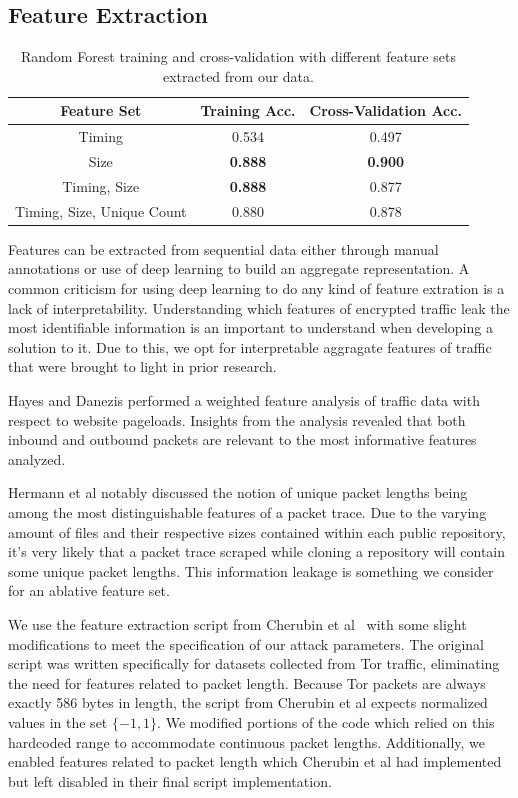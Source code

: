 \documentclass[sigconf,authorversion,nonacm]{acmart}
\begin{document}
\subsection{Feature Extraction}
\begin{center}
  \begin{table}
    \begin{tabular}{ |c || c | c| }
      \hline 
      Feature Set& Training Acc.& Cross-Validation Acc.\\
      \hline
      Timing & 0.534 & 0.497 \\ 
      Size & \textbf{0.888} & \textbf{0.900} \\ 
      Timing, Size & \textbf{0.888} & 0.877 \\ 
      Timing, Size, Unique Count & 0.880 & 0.878 \\ 
      \hline
    \end{tabular}
    \caption{Random Forest training and cross-validation with different feature sets extracted from our data.}
    \label{table:featuresets}
  \end{table}
\end{center}

Features can be extracted from sequential data either through manual annotations or use of deep learning to build an aggregate representation. A common criticism for using deep learning to do any kind of feature extration is a lack of interpretability. Understanding which features of encrypted traffic leak the most identifiable information is an important to understand when developing a solution to it. Due to this, we opt for interpretable aggragate features of traffic that were brought to light in prior research.

Hayes and Danezis\citep{hayes2016k} performed a weighted feature analysis of traffic data with respect to website pageloads. Insights from the analysis revealed that both inbound and outbound packets are relevant to the most informative features analyzed.

Hermann et al \citep{herrmann2009website} notably discussed the notion of unique packet lengths being among the most distinguishable features of a packet trace. Due to the varying amount of files and their respective sizes contained within each public repository, it's very likely that a packet trace scraped while cloning a repository will contain some unique packet lengths. This information leakage is something we consider for an ablative feature set.

We use the feature extraction script from Cherubin et al~\citep{cherubin2017bayes} with some slight modifications to meet the specification of our attack parameters. The original script was written specifically for datasets collected from Tor traffic, eliminating the need for features related to packet length. Because Tor packets are always exactly 586 bytes in length, the script from Cherubin et al expects normalized values in the set $\{-1,1\}$. We modified portions of the code which relied on this hardcoded range to accommodate continuous packet lengths. Additionally, we enabled features related to packet length which Cherubin et al had implemented but left disabled in their final script implementation.
\end{document}
